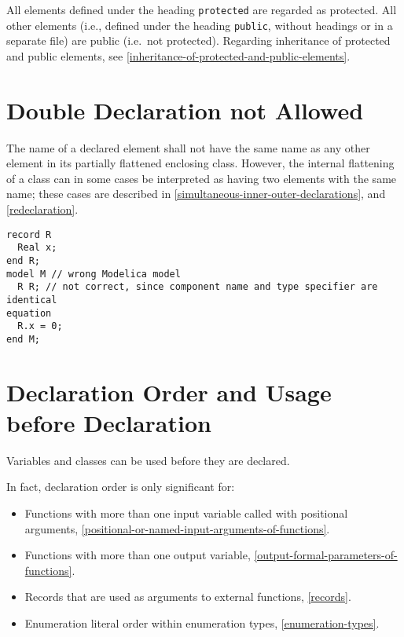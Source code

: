 All elements defined under the heading \lstinline!protected! are regarded as protected.  All other elements (i.e., defined
under the heading \lstinline!public!, without headings or in a separate file) are public (i.e.\ not protected).  Regarding
inheritance of protected and public elements, see \cref{inheritance-of-protected-and-public-elements}.


\section{Double Declaration not Allowed}\label{double-declaration-not-allowed}

The name of a declared element shall not have the same name as any other
element in its partially flattened enclosing class. However, the internal
flattening of a class can in some cases be interpreted as having two
elements with the same name; these cases are described in \cref{simultaneous-inner-outer-declarations},
and \cref{redeclaration}.

\begin{example}
\begin{lstlisting}[language=modelica]
record R
  Real x;
end R;
model M // wrong Modelica model
  R R; // not correct, since component name and type specifier are identical
equation
  R.x = 0;
end M;
\end{lstlisting}
\end{example}

\section{Declaration Order and Usage before Declaration}\label{declaration-order-and-usage-before-declaration}

Variables and classes can be used before they are declared.

\begin{nonnormative}
In fact, declaration order is only significant for:
\begin{itemize}
\item
  Functions with more than one input variable called with positional arguments, \cref{positional-or-named-input-arguments-of-functions}.
\item
  Functions with more than one output variable, \cref{output-formal-parameters-of-functions}.
\item
  Records that are used as arguments to external functions, \cref{records}.
\item
  Enumeration literal order within enumeration types, \cref{enumeration-types}.
\end{itemize}
\end{nonnormative}

